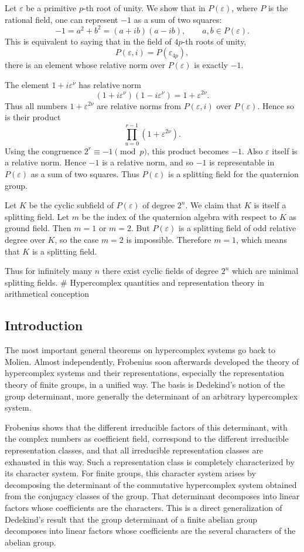 \documentclass[
  12pt,
]{article}
\begin{document}
Let \(\varepsilon\) be a primitive \(p\)-th root of unity. We show that
in \(P(\varepsilon)\), where \(P\) is the rational field, one can
represent \(-1\) as a sum of two squares: \[
  -1=a^2+b^2=(a+ib)(a-ib),
  \qquad a,b\in P(\varepsilon).
\] This is equivalent to saying that in the field of \(4p\)-th roots of
unity, \[
  P(\varepsilon,i)=P(\varepsilon_{4p}),
\] there is an element whose relative norm over \(P(\varepsilon)\) is
exactly \(-1\).

The element \(1+i\varepsilon^{\nu}\) has relative norm \[
  (1+i\varepsilon^{\nu})(1-i\varepsilon^{\nu})
  =1+
\varepsilon^{2\nu}.
\] Thus all numbers \(1+
\varepsilon^{2\nu}\) are relative norms from \(P(\varepsilon,i)\) over
\(P(\varepsilon)\). Hence so is their product \[
  \prod_{
u=0}^{r-1}(1+
\varepsilon^{2\nu}).
\] Using the congruence \(2^r\equiv-1\pmod p\), this product becomes
\(-1\). Also \(\varepsilon\) itself is a relative norm. Hence \(-1\) is
a relative norm, and so \(-1\) is representable in \(P(\varepsilon)\) as
a sum of two squares. Thus \(P(\varepsilon)\) is a splitting field for
the quaternion group.

Let \(K\) be the cyclic subfield of \(P(\varepsilon)\) of degree
\(2^n\). We claim that \(K\) is itself a splitting field. Let \(m\) be
the index of the quaternion algebra with respect to \(K\) as ground
field. Then \(m=1\) or \(m=2\). But \(P(\varepsilon)\) is a splitting
field of odd relative degree over \(K\), so the case \(m=2\) is
impossible. Therefore \(m=1\), which means that \(K\) is a splitting
field.

Thus for infinitely many \(n\) there exist cyclic fields of degree
\(2^n\) which are minimal splitting fields. \# Hypercomplex quantities
and representation theory in arithmetical conception

\subsection{Introduction}\label{introduction}

The most important general theorems on hypercomplex systems go back to
Molien. Almost independently, Frobenius soon afterwards developed the
theory of hypercomplex systems and their representations, especially the
representation theory of finite groups, in a unified way. The basis is
Dedekind's notion of the group determinant, more generally the
determinant of an arbitrary hypercomplex system.

Frobenius shows that the different irreducible factors of this
determinant, with the complex numbers as coefficient field, correspond
to the different irreducible representation classes, and that all
irreducible representation classes are exhausted in this way. Such a
representation class is completely characterized by its character
system. For finite groups, this character system arises by decomposing
the determinant of the commutative hypercomplex system obtained from the
conjugacy classes of the group. That determinant decomposes into linear
factors whose coefficients are the characters. This is a direct
generalization of Dedekind's result that the group determinant of a
finite abelian group decomposes into linear factors whose coefficients
are the several characters of the abelian group.
\end{document}
